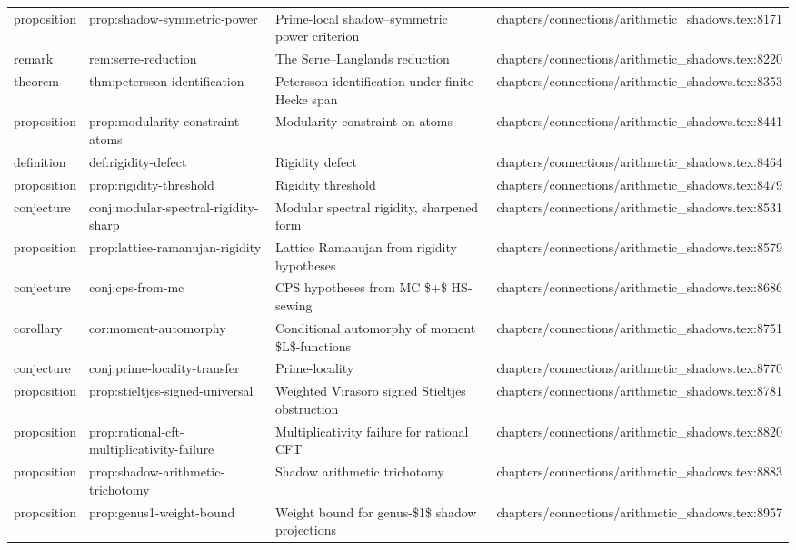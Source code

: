 \documentclass[11pt]{article}
\begin{document}
\begin{longtable}{L{0.10\textwidth}L{0.26\textwidth}L{0.42\textwidth}L{0.22\textwidth}}
proposition & prop:shadow-symmetric-power & Prime-local shadow--symmetric power criterion & chapters/connections/arithmetic\_shadows.tex:8171\\
remark & rem:serre-reduction & The Serre--Langlands reduction & chapters/connections/arithmetic\_shadows.tex:8220\\
theorem & thm:petersson-identification & Petersson identification under finite Hecke span & chapters/connections/arithmetic\_shadows.tex:8353\\
proposition & prop:modularity-constraint-atoms & Modularity constraint on atoms & chapters/connections/arithmetic\_shadows.tex:8441\\
definition & def:rigidity-defect & Rigidity defect & chapters/connections/arithmetic\_shadows.tex:8464\\
proposition & prop:rigidity-threshold & Rigidity threshold & chapters/connections/arithmetic\_shadows.tex:8479\\
conjecture & conj:modular-spectral-rigidity-sharp & Modular spectral rigidity, sharpened form & chapters/connections/arithmetic\_shadows.tex:8531\\
proposition & prop:lattice-ramanujan-rigidity & Lattice Ramanujan from rigidity hypotheses & chapters/connections/arithmetic\_shadows.tex:8579\\
conjecture & conj:cps-from-mc & CPS hypotheses from MC \$+\$ HS-sewing & chapters/connections/arithmetic\_shadows.tex:8686\\
corollary & cor:moment-automorphy & Cond{}itional automorphy of moment \$L\$-functions & chapters/connections/arithmetic\_shadows.tex:8751\\
conjecture & conj:prime-locality-transfer & Prime-locality & chapters/connections/arithmetic\_shadows.tex:8770\\
proposition & prop:stieltjes-signed-universal & Weighted Virasoro signed Stieltjes obstruction & chapters/connections/arithmetic\_shadows.tex:8781\\
proposition & prop:rational-cft-multiplicativity-failure & Multiplicativity failure for rational CFT & chapters/connections/arithmetic\_shadows.tex:8820\\
proposition & prop:shadow-arithmetic-trichotomy & Shadow arithmetic trichotomy & chapters/connections/arithmetic\_shadows.tex:8883\\
proposition & prop:genus1-weight-bound & Weight bound for genus-\$1\$ shadow projections & chapters/connections/arithmetic\_shadows.tex:8957\\

\end{longtable}
\end{document}
